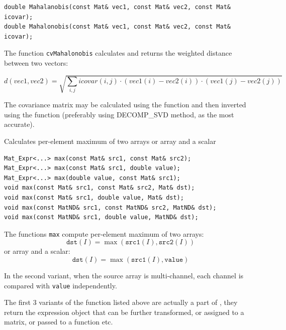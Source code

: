 \begin{lstlisting}
double Mahalanobis(const Mat& vec1, const Mat& vec2, const Mat& icovar);
double Mahalonobis(const Mat& vec1, const Mat& vec2, const Mat& icovar);
\end{lstlisting}
\begin{description}
\end{description}

The function \texttt{cvMahalonobis} calculates and returns the weighted distance between two vectors:

\[
d(vec1,vec2)=\sqrt{\sum_{i,j}{icovar(i,j)\cdot(vec1(i)-vec2(i))\cdot(vec1(j)-vec2(j))}}
\]

The covariance matrix may be calculated using the  function and then inverted using the  function (preferably using DECOMP\_SVD method, as the most accurate).


\label{max}
Calculates per-element maximum of two arrays or array and a scalar

\begin{lstlisting}
Mat_Expr<...> max(const Mat& src1, const Mat& src2);
Mat_Expr<...> max(const Mat& src1, double value);
Mat_Expr<...> max(double value, const Mat& src1);
void max(const Mat& src1, const Mat& src2, Mat& dst);
void max(const Mat& src1, double value, Mat& dst);
void max(const MatND& src1, const MatND& src2, MatND& dst);
void max(const MatND& src1, double value, MatND& dst);
\end{lstlisting}
\begin{description}
\end{description}

The functions \texttt{max} compute per-element maximum of two arrays:
\[\texttt{dst}(I)=\max(\texttt{src1}(I), \texttt{src2}(I))\]
or array and a scalar:
\[\texttt{dst}(I)=\max(\texttt{src1}(I), \texttt{value})\]

In the second variant, when the source array is multi-channel, each channel is compared with \texttt{value} independently.

The first 3 variants of the function listed above are actually a part of , they return the expression object that can be further transformed, or assigned to a matrix, or passed to a function etc.


